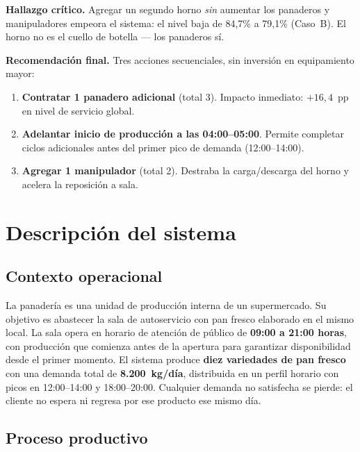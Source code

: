 \documentclass[12pt]{article}
\begin{document}
\medskip
\noindent\textbf{Hallazgo crítico.} Agregar un segundo horno \emph{sin} aumentar los panaderos y manipuladores empeora el sistema: el nivel baja de 84,7\% a 79,1\% (Caso~B). El horno no es el cuello de botella --- los panaderos sí.

\medskip
\noindent\textbf{Recomendación final.} Tres acciones secuenciales, sin inversión en equipamiento mayor:
\begin{enumerate}
  \item \textbf{Contratar 1 panadero adicional} (total 3). Impacto inmediato: $+16,4$~pp en nivel de servicio global.
  \item \textbf{Adelantar inicio de producción a las 04:00--05:00}. Permite completar ciclos adicionales antes del primer pico de demanda (12:00--14:00).
  \item \textbf{Agregar 1 manipulador} (total 2). Destraba la carga/descarga del horno y acelera la reposición a sala.
\end{enumerate}

\newpage
\section{Descripción del sistema}

\subsection{Contexto operacional}

La panadería es una unidad de producción interna de un supermercado. Su objetivo es abastecer la sala de autoservicio con pan fresco elaborado en el mismo local. La sala opera en horario de atención de público de \textbf{09:00 a 21:00 horas}, con producción que comienza antes de la apertura para garantizar disponibilidad desde el primer momento. El sistema produce \textbf{diez variedades de pan fresco} con una demanda total de \textbf{8.200~kg/día}, distribuida en un perfil horario con picos en 12:00--14:00 y 18:00--20:00. Cualquier demanda no satisfecha se pierde: el cliente no espera ni regresa por ese producto ese mismo día.

\subsection{Proceso productivo}
\end{document}
